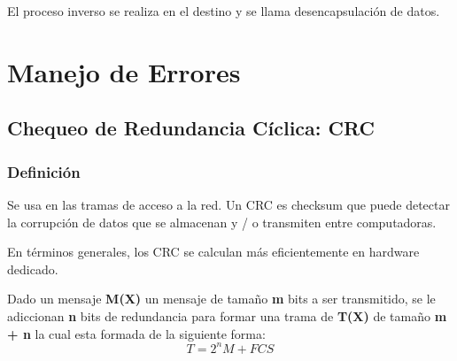 \documentclass[12pt, fleqn]{report}                             %
\theoremstyle{break}                                            %
\begin{document}
            El proceso inverso se realiza en el destino y se llama desencapsulación de datos.










    \chapter{Manejo de Errores}


        \clearpage
        \section{Chequeo de Redundancia Cíclica: CRC}

            \subsection{Definición}

                Se usa en las tramas de acceso a la red.
                Un CRC es checksum que puede detectar la corrupción de datos que se
                almacenan y / o transmiten entre computadoras. 

                En términos generales, los CRC se calculan más eficientemente en hardware dedicado.


                Dado un mensaje \textbf{M(X)} un mensaje de tamaño \textbf{m} bits a ser transmitido,
                se le adiccionan \textbf{n} bits de redundancia para formar una trama de \textbf{T(X)}
                de tamaño \textbf{m + n} la cual esta formada de la siguiente forma:
                \begin{equation*}
                    T = 2^n M + FCS
                \end{equation*}
\end{document}
